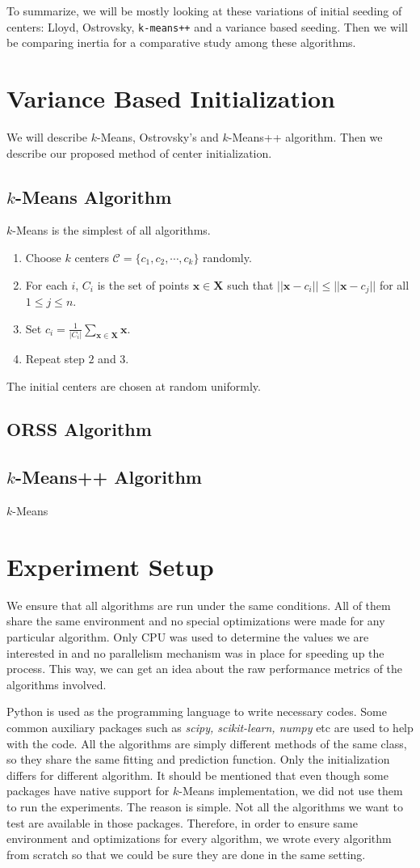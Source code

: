 \documentclass[10pt, leqno]{article}
\begin{document}
	To summarize, we will be mostly looking at these variations of initial seeding of centers: Lloyd, Ostrovsky, \texttt{k-means++} and a variance based seeding. Then we will be comparing inertia for a comparative study among these algorithms.
	\section{Variance Based Initialization}
	We will describe $k$-Means, Ostrovsky's and $k$-Means++ algorithm. Then we describe our proposed method of center initialization.
	\subsection{$k$-Means Algorithm}
	$k$-Means is the simplest of all algorithms.
		\begin{enumerate}[i]
			\item Choose $k$ centers $\mathcal{C}=\{c_1,c_2,\cdots,c_k\}$ randomly.
			\item For each $i$, $C_i$ is the set of points $\mathbf{x}\in\mathbf{X}$ such that $||\mathbf{x}-c_i||\leq ||\mathbf{x}-c_j||$ for all $1\leq j\leq n$.
			\item Set $c_i=\frac{1}{|C_i|}\sum_{\mathbf{x}\in\mathbf{X}}\mathbf{x}$.
			\item Repeat step $2$ and $3$.
		\end{enumerate}
	The initial centers are chosen at random uniformly.
	\subsection{ORSS Algorithm}
	\subsection{$k$-Means++ Algorithm}
	$k$-Means 
	\section{Experiment Setup}
	We ensure that all algorithms are run under the same conditions. All of them share the same environment and no special optimizations were made for any particular algorithm. Only CPU was used to determine the values we are interested in and no parallelism mechanism was in place for speeding up the process. This way, we can get an idea about the raw performance metrics of the algorithms involved.
	
	Python is used as the programming language to write necessary codes. Some common auxiliary packages such as \textit{scipy, scikit-learn, numpy} etc are used to help with the code. All the algorithms are simply different methods of the same class, so they share the same fitting and prediction function. Only the initialization differs for different algorithm. It should be mentioned that even though some packages have native support for $k$-Means implementation, we did not use them to run the experiments. The reason is simple. Not all the algorithms we want to test are available in those packages. Therefore, in order to ensure same environment and optimizations for every algorithm, we wrote every algorithm from scratch so that we could be sure they are done in the same setting.
	
\end{document}

